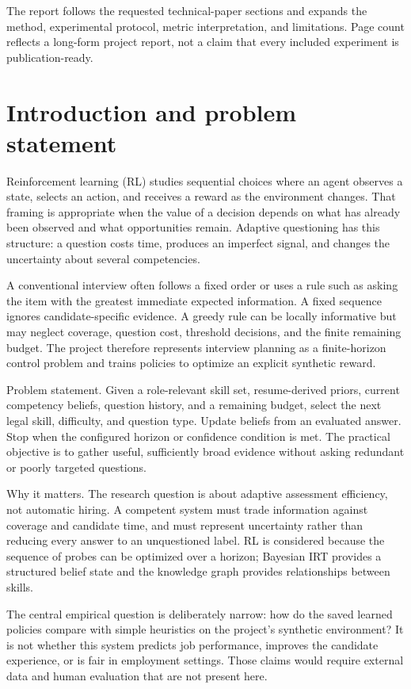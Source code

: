 \documentclass{ieeeaccess}
\begin{document}
The report follows the requested technical-paper sections and expands the method, experimental protocol, metric interpretation, and limitations. Page count reflects a long-form project report, not a claim that every included experiment is publication-ready.

\section{Introduction and problem statement}

Reinforcement learning (RL) studies sequential choices where an agent observes a state, selects an action, and receives a reward as the environment changes. That framing is appropriate when the value of a decision depends on what has already been observed and what opportunities remain. Adaptive questioning has this structure: a question costs time, produces an imperfect signal, and changes the uncertainty about several competencies.

A conventional interview often follows a fixed order or uses a rule such as asking the item with the greatest immediate expected information. A fixed sequence ignores candidate-specific evidence. A greedy rule can be locally informative but may neglect coverage, question cost, threshold decisions, and the finite remaining budget. The project therefore represents interview planning as a finite-horizon control problem and trains policies to optimize an explicit synthetic reward.

Problem statement. Given a role-relevant skill set, resume-derived priors, current competency beliefs, question history, and a remaining budget, select the next legal skill, difficulty, and question type. Update beliefs from an evaluated answer. Stop when the configured horizon or confidence condition is met. The practical objective is to gather useful, sufficiently broad evidence without asking redundant or poorly targeted questions.

Why it matters. The research question is about adaptive assessment efficiency, not automatic hiring. A competent system must trade information against coverage and candidate time, and must represent uncertainty rather than reducing every answer to an unquestioned label. RL is considered because the sequence of probes can be optimized over a horizon; Bayesian IRT provides a structured belief state and the knowledge graph provides relationships between skills.

The central empirical question is deliberately narrow: how do the saved learned policies compare with simple heuristics on the project's synthetic environment? It is not whether this system predicts job performance, improves the candidate experience, or is fair in employment settings. Those claims would require external data and human evaluation that are not present here.
\end{document}
